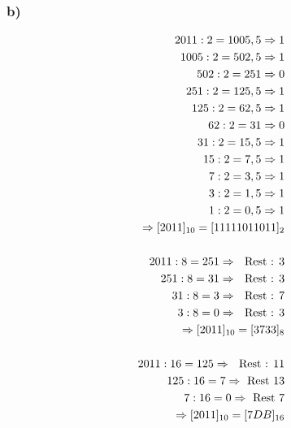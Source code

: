 \documentclass[12pt,a4paper]{article}
\begin{document}
\subsubsection*{b)}
\begin{align*}
2011 : 2 = 1005,5 \Rightarrow 1 \\
1005 : 2 = 502,5 \Rightarrow 1 \\
502 : 2 = 251 \Rightarrow 0 \\
251 : 2 = 125,5 \Rightarrow 1 \\
125 : 2 = 62,5 \Rightarrow 1 \\
62 : 2 = 31 \Rightarrow 0 \\
31 : 2 = 15,5 \Rightarrow 1 \\
15 : 2 = 7,5 \Rightarrow 1 \\
7 : 2 = 3,5 \Rightarrow 1 \\
3 : 2 = 1,5 \Rightarrow 1 \\
1 : 2 = 0,5 \Rightarrow 1 \\
\Rightarrow [2011]_{10} = [11111011011]_{2} \\
\\
2011 : 8 = 251 \Rightarrow \textrm{ \textrm{ Rest }: } 3 \\
251 : 8 = 31 \Rightarrow \textrm{ \textrm{ Rest }: } 3 \\
31 : 8 = 3 \Rightarrow \textrm{ \textrm{ Rest }: } 7 \\
3 : 8 = 0 \Rightarrow \textrm{ \textrm{ Rest }: } 3 \\
\Rightarrow [2011]_{10} = [3733]_{8} \\
\\
2011 : 16 = 125 \Rightarrow \textrm{ \textrm{ Rest }: } 11 \\
125 : 16 = 7 \Rightarrow \textrm{ Rest } 13 \\
7 : 16 = 0 \Rightarrow \textrm{ Rest } 7 \\
\Rightarrow [2011]_{10} = [7DB]_{16}
\end{align*}
\end{document}
